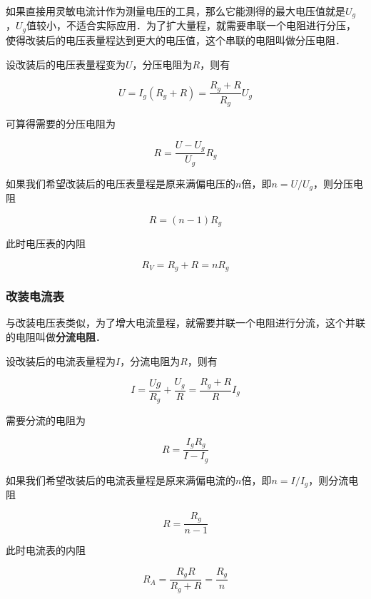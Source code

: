 如果直接用灵敏电流计作为测量电压的工具，那么它能测得的最大电压值就是$U_g$，$U_g$值较小，不适合实际应用．为了扩大量程，就需要串联一个电阻进行分压，使得改装后的电压表量程达到更大的电压值，这个串联的电阻叫做分压电阻．

设改装后的电压表量程变为$U$，分压电阻为$R$，则有

\begin{equation}
U=I_g(R_g+R)=\frac{R_g+R}{R_g}U_g
\end{equation}

可算得需要的分压电阻为

\begin{equation}
R=\frac{U-U_g}{U_g}R_g
\end{equation}

如果我们希望改装后的电压表量程是原来满偏电压的$n$倍，即$n=U/U_g$，则分压电阻

\begin{equation}
R=(n-1)R_g
\end{equation}

此时电压表的内阻

\begin{equation}
R_V=R_g+R=nR_g
\end{equation}

\subsubsection{改装电流表}

与改装电压表类似，为了增大电流量程，就需要并联一个电阻进行分流，这个并联的电阻叫做\textbf{分流电阻}．

设改装后的电流表量程为$I$，分流电阻为$R$，则有

\begin{equation}
I=\frac{Ug}{R_g}+\frac{U_g}{R}=\frac{R_g+R}{R}I_g
\end{equation}

需要分流的电阻为

\begin{equation}
R=\frac{I_gR_g}{I-I_g}
\end{equation}

如果我们希望改装后的电流表量程是原来满偏电流的$n$倍，即$n=I/I_g$，则分流电阻

\begin{equation}
R=\frac{R_g}{n-1}
\end{equation}

此时电流表的内阻

\begin{equation}
R_A=\frac{R_gR}{R_g+R}=\frac{R_g}{n}
\end{equation}
